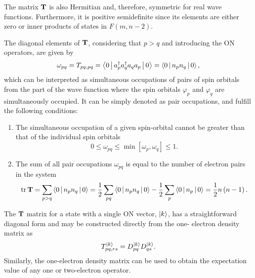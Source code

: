 The matrix $ \mat{T}$ is also Hermitian and, therefore, symmetric for real
wave functions.
Furthermore, it is positive semidefinite since its elements are either zero
or inner products of states in $F\left( m, n-2 \right)$.

The diagonal elements of $ \mat{T}$, considering that $p > q$ and introducing
the ON operators, are given by
\begin{equation}
    \omega_{pq} = T_{pq,pq} =
    \Braket{0 | a_p^{\dagger} a_q^{\dagger} a_q a_p | 0} =
    \Braket{0 | n_p n_q | 0},
\end{equation}
which can be interpreted as simultaneous occupations of pairs of spin orbitals
from the part of the wave function where the spin
orbitals $\varphi_p$ and $\varphi_q$ are simultaneously occupied.
It can be simply denoted as pair occupations, and fulfill the following conditions:
\begin{enumerate}
    \item The simultaneous occupation of a given spin-orbital cannot be greater than that
        of the individual spin orbitals
        \begin{equation}
            0 \le \omega_{pq} \le \min\left[ \omega_p, \omega_q \right] \le 1
            .
        \end{equation}

    \item The sum of all pair occupations $\omega_{pq}$ is equal to the number of
        electron pairs in the system 
        \begin{equation}
            \trace \mat{T} =
            \sum_{p>q} \Braket{0 | n_p n_q | 0} =
            \frac{1}{2} \sum_{pq} \Braket{0 | n_p n_q | 0}
            - \frac{1}{2} \sum_{p} \Braket{0 | n_p | 0} =
            \frac{1}{2} n \left( n - 1 \right)
            .
        \end{equation}
\end{enumerate}

The $ \mat{T}$ matrix for a state with a single ON vector, $\Ket{k}$, has a 
straightforward diagonal form and may be constructed directly from the one-
electron density matrix as
\begin{equation}
    T_{pq,rs}^{\Ket{k}} = D_{pq}^{\Ket{k}} D_{qs}^{\Ket{k}}
    .
\end{equation}
Similarly, the one-electron density matrix can be used to obtain the 
expectation value of any one or two-electron operator.

